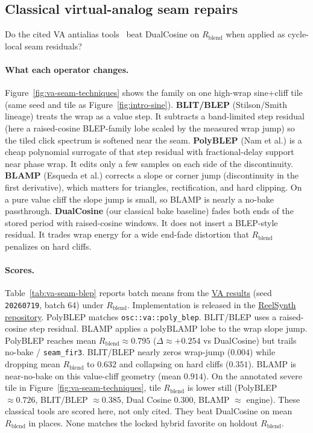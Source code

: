 \subsection{Classical virtual-analog seam repairs}
\label{sec:va-seam-baselines}

Do the cited VA antialias tools~\cite{stilson1996,nam2009polyblep,esqueda2016blamp} beat DualCosine on $R_{\mathrm{blend}}$ when applied as cycle-local seam residuals?

\paragraph{What each operator changes.}
Figure~\ref{fig:va-seam-techniques} shows the family on one high-wrap sine{+}cliff tile (same seed and tile as Figure~\ref{fig:intro-sine}).
\textbf{BLIT/BLEP} (Stilson/Smith lineage) treats the wrap as a value step.
It subtracts a band-limited step residual (here a raised-cosine BLEP-family lobe scaled by the measured wrap jump) so the tiled click spectrum is softened near the seam.
\textbf{PolyBLEP} (Nam et al.) is a cheap polynomial surrogate of that step residual with fractional-delay support near phase wrap.
It edits only a few samples on each side of the discontinuity.
\textbf{BLAMP} (Esqueda et al.) corrects a slope or corner jump (discontinuity in the first derivative), which matters for triangles, rectification, and hard clipping.
On a pure value cliff the slope jump is small, so BLAMP is nearly a no-bake passthrough.
\textbf{DualCosine} (our classical bake baseline) fades both ends of the stored period with raised-cosine windows.
It does not insert a BLEP-style residual.
It trades wrap energy for a wide end-fade distortion that $R_{\mathrm{blend}}$ penalizes on hard cliffs.

\paragraph{Scores.}
Table~\ref{tab:va-seam-blep} reports batch means from the \href{https://github.com/reeldemo/denoise-opt-meta/blob/master/paper/Unsupervised_Wavetable_Seam_Artifact_Repair_via_Hybrid_GA-PPO_Meta-Search_v11/figures/va_seam_blep.json}{VA results} (seed \texttt{20260719}, batch 64) under $R_{\mathrm{blend}}$.
Implementation is released in the \href{https://github.com/reeldemo/reelsynth}{ReelSynth repository}. PolyBLEP matches \texttt{osc::va::poly\_blep}. BLIT/BLEP uses a raised-cosine step residual. BLAMP applies a polyBLAMP lobe to the wrap slope jump.
PolyBLEP reaches mean $R_{\mathrm{blend}}\approx 0.795$ ($\Delta\approx{+}0.254$ vs DualCosine) but trails no-bake / \texttt{seam\_fir3}.
BLIT/BLEP nearly zeros wrap-jump ($0.004$) while dropping mean $R_{\mathrm{blend}}$ to $0.632$ and collapsing on hard cliffs ($0.351$).
BLAMP is near-no-bake on this value-cliff geometry (mean $0.914$).
On the annotated severe tile in Figure~\ref{fig:va-seam-techniques}, tile $R_{\mathrm{blend}}$ is lower still (PolyBLEP $\approx 0.726$, BLIT/BLEP $\approx 0.385$, Dual Cosine $0.300$, BLAMP $\approx$ engine).
These classical tools are scored here, not only cited.
They beat DualCosine on mean $R_{\mathrm{blend}}$ in places.
None matches the locked hybrid favorite on holdout $R_{\mathrm{blend}}$.

